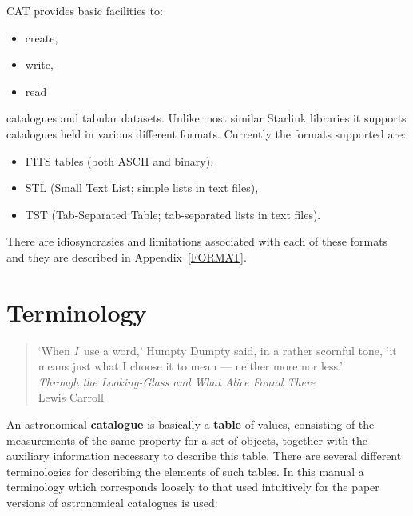\documentclass[11pt,twoside]{starlink}
\begin{document}
CAT provides basic facilities to:

\begin{itemize}

  \item create,

  \item write,

  \item read

\end{itemize}

catalogues and tabular datasets. Unlike most similar Starlink libraries
it supports catalogues held in various different formats. Currently the
formats supported are:

\begin{itemize}

  \item FITS tables (both ASCII and binary),

  \item STL (Small Text List; simple lists in text files),

  \item TST (Tab-Separated Table; tab-separated lists in text files).

\end{itemize}

There are idiosyncrasies and limitations associated with each of these
formats and they are described in Appendix~\ref{FORMAT}.


\section{\label{TERM}Terminology}

\begin{quote} \latex{\raggedright}
`When \textit{I}\, use a word,' Humpty Dumpty said, in a rather scornful
tone, `it means just what I choose it to mean --- neither more nor
less.' \\
\textit{Through the Looking-Glass and What Alice Found There} \latex{\raggedleft}
\\ Lewis Carroll
\end{quote}

An astronomical \textbf{catalogue} is basically a \textbf{table} of values,
consisting of the measurements of the same property for a set of
objects, together with the auxiliary information necessary to describe
this table. There are several different terminologies for describing
the elements of such tables. In this manual a terminology which
corresponds loosely to that used intuitively for the paper versions of
astronomical catalogues is used:
\end{document}
